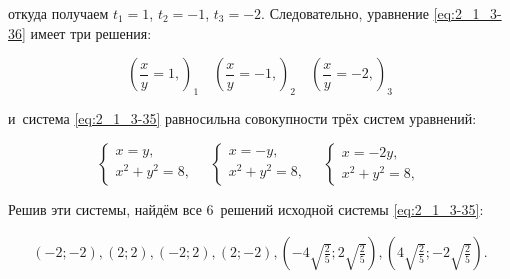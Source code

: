 \noindent
откуда получаем $t_{1} = 1$, $t_{2} = -1$, $t_{3} = -2$.
Следовательно, уравнение \eqref{eq:2_1_3-36} имеет три решения:

\begin{equation}\label{eq:2_1_3-38}
\left(
\displaystyle \frac{x}{y} = 1,
\right)_{1} \quad
\left(
\displaystyle \frac{x}{y} = -1,
\right)_{2} \quad
\left(
\displaystyle \frac{x}{y} = -2,
\right)_{3}
\end{equation}

\noindent
и~система \eqref{eq:2_1_3-35} равносильна совокупности трёх систем уравнений:

\begin{equation*}
\begin{cases}
x = y, \\
x^{2} + y^{2} = 8,
\end{cases} \quad
\begin{cases}
x = -y, \\
x^{2} + y^{2} = 8,
\end{cases} \quad
\begin{cases}
x = -2y, \\
x^{2} + y^{2} = 8,
\end{cases}
\end{equation*}

Решив эти системы, найдём все 6~решений исходной системы \eqref{eq:2_1_3-35}:

\begin{gather*}
(-2; -2), (2; 2), (-2; 2), (2; -2), 
\displaystyle
\left( -4\sqrt{\frac{2}{5}}; 2\sqrt{\frac{2}{5}} \right),
\left( 4\sqrt{\frac{2}{5}}; -2\sqrt{\frac{2}{5}} \right).
\end{gather*}


